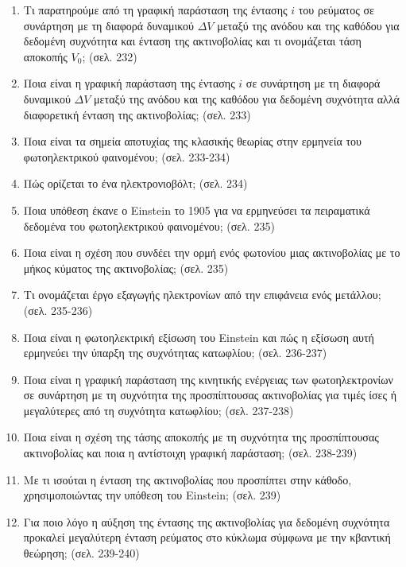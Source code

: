 \documentclass{article}
\begin{document}
\begin{enumerate}
      \item Τι παρατηρούμε από τη γραφική παράσταση της έντασης $i$ του ρεύματος σε συνάρτηση με τη διαφορά δυναμικού $\Delta V$ μεταξύ της ανόδου και της καθόδου για δεδομένη συχνότητα και ένταση της ακτινοβολίας και τι ονομάζεται τάση αποκοπής $V_0$; (σελ. 232)

      \item Ποια είναι η γραφική παράσταση της έντασης $i$ σε συνάρτηση με τη διαφορά δυναμικού $\Delta V$ μεταξύ της ανόδου και της καθόδου για δεδομένη συχνότητα αλλά διαφορετική ένταση της ακτινοβολίας; (σελ. 233)

      \item Ποια είναι τα σημεία αποτυχίας της κλασικής θεωρίας στην ερμηνεία του φωτοηλεκτρικού φαινομένου; (σελ. 233-234)

      \item Πώς ορίζεται το ένα ηλεκτρονιοβόλτ; (σελ. 234)

      \item Ποια υπόθεση έκανε ο Einstein το 1905 για να ερμηνεύσει τα πειραματικά δεδομένα του φωτοηλεκτρικού φαινομένου; (σελ. 235)

      \item Ποια είναι η σχέση που συνδέει την ορμή ενός φωτονίου μιας ακτινοβολίας με το μήκος κύματος της ακτινοβολίας; (σελ. 235)

      \item Τι ονομάζεται έργο εξαγωγής ηλεκτρονίων από την επιφάνεια ενός μετάλλου; (σελ. 235-236)

      \item Ποια είναι η φωτοηλεκτρική εξίσωση του Einstein και πώς η εξίσωση αυτή ερμηνεύει την ύπαρξη της συχνότητας κατωφλίου; (σελ. 236-237)

      \item Ποια είναι η γραφική παράσταση της κινητικής ενέργειας των φωτοηλεκτρονίων σε συνάρτηση με τη συχνότητα της προσπίπτουσας ακτινοβολίας για τιμές ίσες ή μεγαλύτερες από τη συχνότητα κατωφλίου; (σελ. 237-238)

      \item Ποια είναι η σχέση της τάσης αποκοπής με τη συχνότητα της προσπίπτουσας ακτινοβολίας και ποια η αντίστοιχη γραφική παράσταση; (σελ. 238-239)

      \item Με τι ισούται η ένταση της ακτινοβολίας που προσπίπτει στην κάθοδο, χρησιμοποιώντας την υπόθεση του Einstein; (σελ. 239)

      \item Για ποιο λόγο η αύξηση της έντασης της ακτινοβολίας για δεδομένη συχνότητα προκαλεί μεγαλύτερη ένταση ρεύματος στο κύκλωμα σύμφωνα με την κβαντική θεώρηση; (σελ. 239-240)


\end{enumerate}
\end{document}
